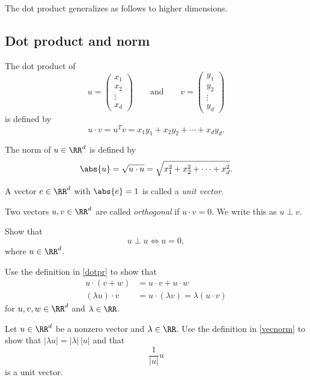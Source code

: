 \documentclass{article}
\begin{document}
The dot product generalizes as follows to higher dimensions.

\subsection{Dot product and norm}

\begin{definition}[emph]
The dot product of
$$
u =
\begin{pmatrix}
  x_1 \\
  x_2 \\
  \vdots
  \\
  x_d
\end{pmatrix}\qquad
\text{and}
\qquad
v =
\begin{pmatrix}
  y_1 \\
  y_2 \\
  \vdots
  \\
  y_d
\end{pmatrix}
$$
is defined by
\begin{equation}\label{dotpr}
u\cdot v = u^T v = x_1 y_1 + x_2 y_2 + \cdots + x_d y_d.
\end{equation}


The norm of $u\in \RR^d$ is defined by
\begin{equation}\label{vecnorm}
\abs{u} = \sqrt{u\cdot u} = \sqrt{x_1^2 + x_2^2 + \cdots + x_d^2}.
\end{equation}


A vector $e\in \RR^d$ with $\abs{e}=1$ is called a \emph{unit vector}.

Two vectors $u, v\in \RR^d$ are called \emph{orthogonal} if $u\cdot v = 0$. We write
this as $u \perp v$.

\end{definition}

\beginshex
Show that
$$
u \perp u \iff u = 0,
$$
where $u\in \RR^d$.
\endshex


\beginshex\label{normrules}
Use the definition in \eqref{dotpr} to show that
\begin{align*}
  u\cdot (v + w) &= u\cdot v + u\cdot w\\
  (\lambda u)\cdot v &= u\cdot (\lambda v) = \lambda (u\cdot v)
\end{align*}
for $u, v, w\in \RR^d$ and $\lambda\in\RR$.
\endshex


\beginshex
Let $u\in \RR^d$ be a nonzero vector and $\lambda\in \RR$. Use the definition
in \eqref{vecnorm} to show that
$|\lambda u| = |\lambda| \, |u|$ and that
$$
\frac{1}{|u|} u
$$
is a unit vector.
\end{document}
